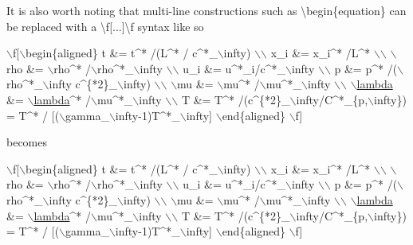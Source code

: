 It is also worth noting that multi-\/line constructions such as \textbackslash{}begin\{equation\} can be replaced with a {\ttfamily \textbackslash{}f\mbox{[}...\mbox{]}\textbackslash{}f} syntax like so 
\begin{DoxyCode}
\(\backslash\)f[\(\backslash\)begin\{aligned\}
t       &= t^* /(L^* / c^*\_\(\backslash\)infty) \(\backslash\)\(\backslash\)
x\_i     &= x\_i^* /L^* \(\backslash\)\(\backslash\)
\(\backslash\)rho    &= \(\backslash\)rho^* /\(\backslash\)rho^*\_\(\backslash\)infty \(\backslash\)\(\backslash\)
u\_i     &= u^*\_i/c^*\_\(\backslash\)infty \(\backslash\)\(\backslash\)
p       &= p^* /(\(\backslash\)rho^*\_\(\backslash\)infty c^\{*2\}\_\(\backslash\)infty) \(\backslash\)\(\backslash\)
\(\backslash\)mu     &= \(\backslash\)mu^* /\(\backslash\)mu^*\_\(\backslash\)infty \(\backslash\)\(\backslash\)
\(\backslash\)\hyperlink{RoeKernels_8H_a89211c91f7e80725e4791ef58e043244}{lambda} &= \(\backslash\)\hyperlink{RoeKernels_8H_a89211c91f7e80725e4791ef58e043244}{lambda}^* /\(\backslash\)mu^*\_\(\backslash\)infty \(\backslash\)\(\backslash\)
T       &= T^* /(c^\{*2\}\_\(\backslash\)infty/C^*\_\{p,\(\backslash\)infty\}) = T^* / [(\(\backslash\)gamma\_\(\backslash\)infty-1)T^*\_\(\backslash\)infty]
\(\backslash\)end\{aligned\}
\(\backslash\)f]
\end{DoxyCode}


becomes


\begin{DoxyCode}
\(\backslash\)f[\(\backslash\)begin\{aligned\}
t       &= t^* /(L^* / c^*\_\(\backslash\)infty) \(\backslash\)\(\backslash\)
x\_i     &= x\_i^* /L^* \(\backslash\)\(\backslash\)
\(\backslash\)rho    &= \(\backslash\)rho^* /\(\backslash\)rho^*\_\(\backslash\)infty \(\backslash\)\(\backslash\)
u\_i     &= u^*\_i/c^*\_\(\backslash\)infty \(\backslash\)\(\backslash\)
p       &= p^* /(\(\backslash\)rho^*\_\(\backslash\)infty c^\{*2\}\_\(\backslash\)infty) \(\backslash\)\(\backslash\)
\(\backslash\)mu     &= \(\backslash\)mu^* /\(\backslash\)mu^*\_\(\backslash\)infty \(\backslash\)\(\backslash\)
\(\backslash\)\hyperlink{RoeKernels_8H_a89211c91f7e80725e4791ef58e043244}{lambda} &= \(\backslash\)\hyperlink{RoeKernels_8H_a89211c91f7e80725e4791ef58e043244}{lambda}^* /\(\backslash\)mu^*\_\(\backslash\)infty \(\backslash\)\(\backslash\)
T       &= T^* /(c^\{*2\}\_\(\backslash\)infty/C^*\_\{p,\(\backslash\)infty\}) = T^* / [(\(\backslash\)gamma\_\(\backslash\)infty-1)T^*\_\(\backslash\)infty]
\(\backslash\)end\{aligned\}
\(\backslash\)f]
\end{DoxyCode}


